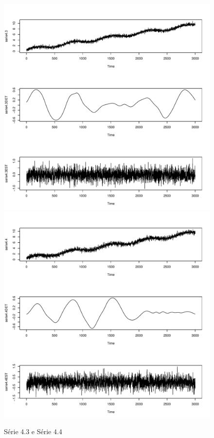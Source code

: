 \graphicspath{{imagens/}}
\begin{figure}[H]
\begin{center}
  \includegraphics[scale=0.43]{serie4_3.pdf} \quad
 \includegraphics[scale=0.43]{serie4_4.pdf}
 \caption{Série 4.3 e Série 4.4}

\end{center}
\end{figure}

